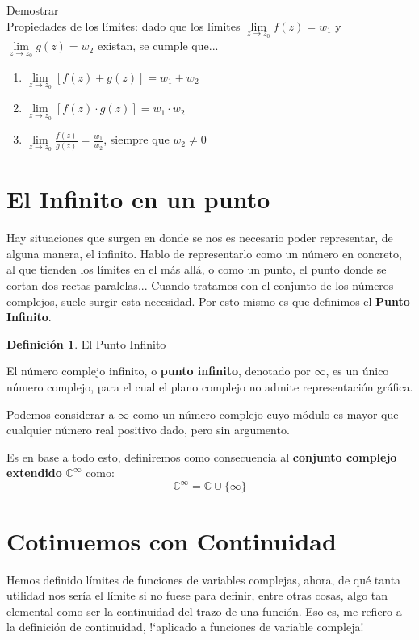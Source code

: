 \documentclass[12pt]{article}
\theoremstyle{definition}
\newtheorem{definition}{Definici\'on}[section]
\theoremstyle{theorem}
\begin{document}
Demostrar\\

Propiedades de los l\'imites: dado que los l\'imites $\lim\limits_{z\rightarrow z_0} f(z) = w_1$ y $\lim\limits_{z\rightarrow z_0} g(z) = w_2$ existan, se cumple que...
\begin{enumerate}
	\item $\lim\limits_{z\rightarrow z_0} [f(z) + g(z)] = w_1 + w_2$
	\item $\lim\limits_{z\rightarrow z_0} [f(z) \cdot g(z)] = w_1 \cdot w_2$
	\item $\displaystyle \lim\limits_{z\rightarrow z_0} \frac{f(z)}{g(z)} = \frac{w_1}{w_2}$, siempre que $w_2 \neq 0$
\end{enumerate}

\section{El Infinito en un punto}
Hay situaciones que surgen en donde se nos es necesario poder representar, de alguna manera, el infinito. Hablo de representarlo como un n\'umero en concreto, al que tienden los l\'imites en el m\'as all\'a, o como un punto, el punto donde se cortan dos rectas paralelas... Cuando tratamos con el conjunto de los n\'umeros complejos, suele surgir esta necesidad. Por esto mismo es que definimos el \textbf{Punto Infinito}.\\

\colorbox{blue!40!white!80}{\parbox{\linewidth}{
\theoremstyle{definition}
\begin{definition}{El Punto Infinito}

El n\'umero complejo infinito, o \textbf{punto infinito}, denotado por $\infty$, es un \'unico n\'umero complejo, para el cual el plano complejo no admite representaci\'on gr\'afica.

Podemos considerar a $\infty$ como un n\'umero complejo cuyo m\'odulo es mayor que cualquier n\'umero real positivo dado, pero sin argumento.

\end{definition}}}
\linebreak
\linebreak

Es en base a todo esto, definiremos como consecuencia al \textbf{conjunto complejo extendido} $\mathbb{C}^\infty$ como:
$$\mathbb{C}^\infty = \mathbb{C} \cup \{\infty\}$$

\section{Cotinuemos con Continuidad}
Hemos definido l\'imites de funciones de variables complejas, ahora, de qu\'e tanta utilidad nos ser\'ia el l\'imite si no fuese para definir, entre otras cosas, algo tan elemental como ser la continuidad del trazo de una funci\'on. Eso es, me refiero a la definici\'on de continuidad, !`aplicado a funciones de variable compleja!\\
\end{document}
